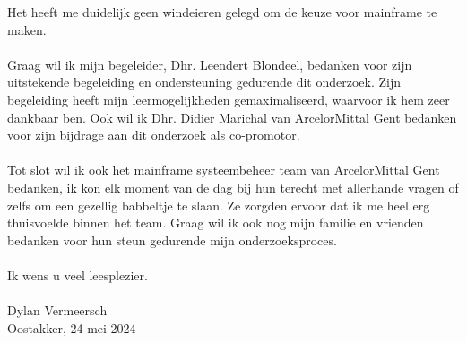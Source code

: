 Het heeft me duidelijk geen windeieren gelegd om de keuze voor mainframe te maken. 
\\ \\
Graag wil ik mijn begeleider, Dhr. Leendert Blondeel, bedanken voor zijn uitstekende begeleiding en ondersteuning gedurende dit onderzoek. 
Zijn begeleiding heeft mijn leermogelijkheden gemaximaliseerd, waarvoor ik hem zeer dankbaar ben. 
Ook wil ik Dhr. Didier Marichal van ArcelorMittal Gent bedanken voor zijn bijdrage aan dit onderzoek als co-promotor. 
\\ \\
Tot slot wil ik ook het mainframe systeembeheer team van ArcelorMittal Gent bedanken, ik kon elk moment van de dag bij hun terecht met allerhande vragen of zelfs om een gezellig babbeltje te slaan. 
Ze zorgden ervoor dat ik me heel erg thuisvoelde binnen het team. 
Graag wil ik ook nog mijn familie en vrienden bedanken voor hun steun gedurende mijn onderzoeksproces. 
\\ \\
Ik wens u veel leesplezier.
\\ \\
Dylan Vermeersch
\\
Oostakker, 24 mei 2024